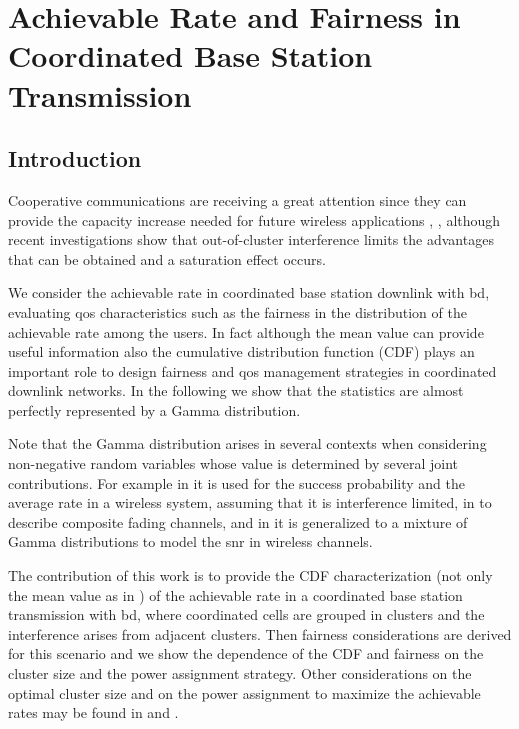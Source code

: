 \chapter[Rate Statistics]{Achievable Rate and Fairness in Coordinated Base Station Transmission}

\section{Introduction}

Cooperative communications are receiving a great attention since they can provide the capacity increase needed for future wireless applications \cite{karakayali06}, \cite{sawahashi10}, although recent investigations show \cite{lozano13} that out-of-cluster interference limits the advantages that can be obtained and a saturation effect occurs.

We consider the achievable rate in coordinated base station downlink with \gls{bd}, evaluating \gls{qos} characteristics such as the fairness in the distribution of the achievable rate among the users. In fact although the mean value can provide useful information \cite{corvaja13b} also the cumulative distribution function (CDF) plays an important role to design fairness and \gls{qos} management strategies in coordinated downlink networks. In the following we show that the statistics are almost perfectly represented by a Gamma distribution.

Note that the Gamma distribution arises in several contexts when considering non-negative random variables whose value is determined by several joint contributions. For example in \cite{heath13} it is used for the success probability and the average rate in a wireless system, assuming that it is interference limited, in \cite{alahmadi10} to describe composite fading channels, and in \cite{atapattu11} it is generalized to a mixture of Gamma distributions to model the \gls{snr} in wireless channels.

The contribution of this work is to provide the CDF characterization (not only the mean value as in \cite{corvaja13b}) of the achievable rate in a coordinated base station transmission with \gls{bd}, where coordinated cells are grouped in clusters and the interference arises from adjacent clusters. Then fairness considerations are derived for this scenario and we show the dependence of the CDF and fairness on the cluster size and the power assignment strategy. Other considerations on the optimal cluster size and on the power assignment to maximize the achievable rates may be found in \cite{corvaja13b} and \cite{armada11b}.

